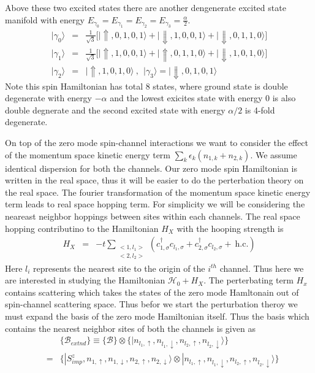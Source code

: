\documentclass[reprint,prb,superscriptaddress]{revtex4-1}
\begin{document}
Above these two excited states there are another dengenerate excited state manifold with energy $ E_{\gamma_0}=E_{\gamma_1}=E_{\gamma_2}=E_{\gamma_3}=\frac{\alpha}{2}$.
\begin{eqnarray}
|\gamma_{0}\rangle &=&\frac{1}{\sqrt{3}} \bigg[|\Uparrow,0,1,0,1\rangle+|\Downarrow,1,0,0,1\rangle+|\Downarrow,0,1,1,0\rangle \bigg] \nonumber\\
|\gamma_{1}\rangle &=& \frac{1}{\sqrt{3}}\bigg[ |\Uparrow,1,0,0,1\rangle+|\Uparrow,0,1,1,0\rangle+|\Downarrow,1,0,1,0\rangle \bigg] \nonumber\\
|\gamma_{2}\rangle &=& |\Uparrow,1,0,1,0\rangle~,~~|\gamma_{3}\rangle = |\Downarrow,0,1,0,1\rangle 
\end{eqnarray}
Note this spin Hamiltonian has total $8$ states, where ground state is double degenerate with energy $-\alpha$ and the lowest exicites state with energy $0$ is also double degnerate and the second excited state with energy $\alpha/2$ is 4-fold degenerate. 
\par On top of the zero mode spin-channel interactions we want to consider the effect of the momentum space kinetic energy term $\sum_{k}\epsilon_k (n_{1,k}+n_{2,k})$. We assume identical dispersion for both the channels. Our zero mode spin Hamiltonian is written in the real space, thus it will be easier to do the perterbation theory on the real space. The fourier transformation of the momentum space kinetic energy  term leads to real space hopping term. For simplicity we will be considering the neareast neighbor hoppings between sites within each channels. The real space hopping contributino to the Hamiltonian $H_X$ with the hooping strength is 
\begin{eqnarray}
H_{X} &=& -t \displaystyle\sum_{\substack{<1,l_1> \\ <2,l_2>}} (c^{\dagger}_{1,\sigma}c_{l_1,\sigma}+c^{\dagger}_{2,\sigma}c_{l_2,\sigma}+ ~\textrm{h.c.})
\end{eqnarray}
Here $l_i$ represents the nearest site to the origin of the $i^{th}$ channel. Thus here we are interested in studying the Hamiltonian $\mathcal{H}_0+H_X$. The perterbating term $H_x$ contains scattering which takes the states of the zero mode Hamltonain out of spin-channel scattering space. Thus befor we start the perturbation theroy we must expand the basis of the zero mode Hamiltonian itself. Thus the basis which contains the nearest neighbor sites of both the channels is given as 
\begin{eqnarray}
&&\{\mathcal{B}_{extnd}\} \equiv  \{\mathcal{B}\} \otimes  \{|n_{l_1,\uparrow},n_{l_1,\downarrow},n_{l_2,\uparrow},n_{l_2,\downarrow}\rangle\} \nonumber\\
&=& \{|S^z_{imp},n_{1,\uparrow},n_{1,\downarrow},n_{2,\uparrow},n_{2,\downarrow}\rangle \otimes |n_{l_1,\uparrow},n_{l_1,\downarrow},n_{l_2,\uparrow},n_{l_2,\downarrow}\rangle\} \nonumber\\
\end{eqnarray}
\end{document}
